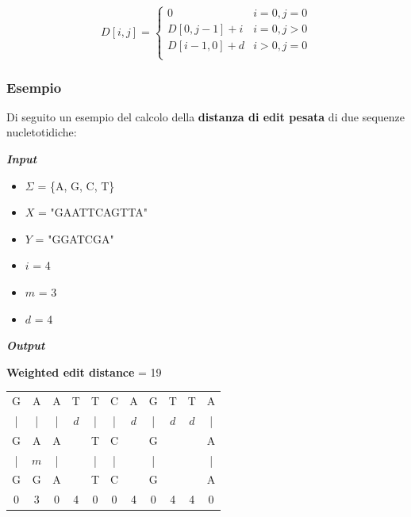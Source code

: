     \begin{equation}
        D[i, j] = \begin{cases}
            0 & i = 0, j = 0 \\
            D[0, j-1] + i & i = 0, j > 0 \\
            D[i-1, 0] + d & i > 0, j = 0 \\
        \end{cases}
        \label{edit-distance-weighted-base-case}
    \end{equation}

\raggedright
\subsubsection{Esempio}
    Di seguito un esempio del calcolo della \textbf{distanza di edit pesata} di due sequenze nucletotidiche:
    
    \vspace{20pt}
    \noindent \textbf{\textit{Input}}
    \begin{itemize}
        \item $\Sigma$ = \{A, G, C, T\} 
        \item $X$ = "GAATTCAGTTA"
        \item $Y$ = "GGATCGA"
        \item $i$ = 4
        \item $m$ = 3
        \item $d$ = 4
    \end{itemize}
    
    \noindent
    \textbf{\textit{Output}}
    
    \centering \textbf{Weighted edit distance} = 19
    \vspace{20pt}
    \begin{table}[h]
        \centering
        \begin{tabular}{ccccccccccc}
             G & A & A & T & T & C & A & G & T & T & A \\
             | & | & | & $d$ & | & | & $d$ & | & $d$ & $d$ & | \\
             G & A & A &   & T & C &   & G &   &   & A \\
             | & $m$ & | &  & | & | &  & | &  &  & | \\
             G & G & A &   & T & C &   & G &   &   & A \\
             \hline
             0 & 3 & 0 & 4 & 0 & 0 & 4 & 0 & 4 & 4 & 0 \\
             \hline
        \end{tabular}
    \end{table}
    \vspace{20pt}


